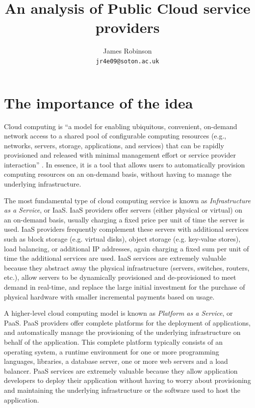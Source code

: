 \documentclass[a4paper]{proc}
\begin{document}
  \title{An analysis of Public Cloud service providers}
  \author{James Robinson\\\texttt{jr4e09@soton.ac.uk}}
  \maketitle

  \begin{abstract}
  \end{abstract}



  \section{The importance of the idea}
  \label{sec:idea}

  Cloud computing is ``a model for enabling ubiquitous, convenient, on-demand network access to a shared pool of configurable computing resources (e.g., networks, servers, storage, applications, and services) that can be rapidly provisioned and released with minimal management effort or service provider interaction'' \cite{Mell2011}. In essence, it is a tool that allows users to automatically provision computing resources on an on-demand basis, without having to manage the underlying infrastructure.

  The most fundamental type of cloud computing service is known as \emph{Infrastructure as a Service}, or IaaS. IaaS providers offer servers (either physical or virtual) on an on-demand basis, usually charging a fixed price per unit of time the server is used. IaaS providers frequently complement these servers with additional services such as block storage (e.g. virtual disks), object storage (e.g. key-value stores), load balancing, or additional IP addresses, again charging a fixed sum per unit of time the additional services are used. IaaS services are extremely valuable because they abstract away the physical infrastructure (servers, switches, routers, etc.), allow servers to be dynamically provisioned and de-provisioned to meet demand in real-time, and replace the large initial investment for the purchase of physical hardware with smaller incremental payments based on usage.

  A higher-level cloud computing model is known as \emph{Platform as a Service}, or PaaS. PaaS providers offer complete platforms for the deployment of applications, and automatically manage the provisioning of the underlying infrastructure on behalf of the application. This complete platform typically consists of an operating system, a runtime environment for one or more programming languages, libraries, a database server, one or more web servers and a load balancer. PaaS services are extremely valuable because they allow application developers to deploy their application without having to worry about provisioning and maintaining the underlying infrastructure or the software used to host the application.
\end{document}
